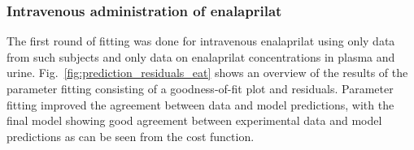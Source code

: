 \documentclass[pharmaceutics,article,submit,pdftex,moreauthors]{Definitions/mdpi}
\begin{document}
\subsubsection{Intravenous administration of enalaprilat}


The first round of fitting was done for intravenous enalaprilat using only data from such subjects and only data on enalaprilat concentrations in plasma and urine. Fig.~\ref{fig:prediction_residuals_eat} shows an overview of the results of the parameter fitting consisting of a goodness-of-fit plot and residuals. Parameter fitting improved the agreement between data and model predictions, with the final model showing good agreement between experimental data and model predictions as can be seen from the cost function.

\end{document}
